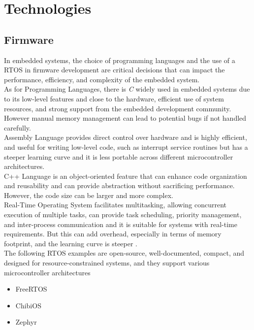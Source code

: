 \chapter{Technologies}
\label{chap:Chapter3}

\section{Firmware}
In embedded systems, the choice of programming languages and the use of a \gls{RTOS} in firmware development are critical decisions that can impact the performance, efficiency, and complexity of the embedded system.\\

As for Programming Languages, there is \textit{C} widely used in embedded systems due to its low-level features and close to the hardware, efficient use of system resources, and strong support from the embedded development community.
However manual memory management can lead to potential bugs if not handled carefully.\\
Assembly Language provides direct control over hardware and is highly efficient, and useful for writing low-level code, such as interrupt service routines but has a steeper learning curve and it is less portable across different microcontroller architectures.\\
C++ Language is an object-oriented feature that can enhance code organization and reusability and can provide abstraction without sacrificing performance.
However, the code size can be larger and more complex.\\

Real-Time Operating System facilitates multitasking, allowing concurrent execution of multiple tasks, can provide task scheduling, priority management, and inter-process communication and it is suitable for systems with real-time requirements.
But this can add overhead, especially in terms of memory footprint, and the learning curve is steeper \cite{RTOS1}.\\
The following \gls{RTOS} examples are open-source, well-documented, compact, and designed for resource-constrained systems, and they support various microcontroller architectures
\begin{itemize}
    \item FreeRTOS
    \item ChibiOS
    \item Zephyr
\end{itemize}

